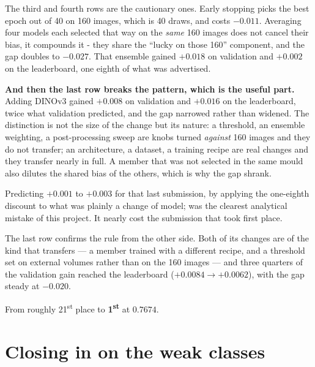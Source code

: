 \documentclass{article}
\begin{document}
The third and fourth rows are the cautionary ones. Early stopping picks the best
epoch out of 40 on 160 images, which is 40 draws, and costs $-0.011$. Averaging
four models each selected that way on the \emph{same} 160 images does not cancel
their bias, it compounds it - they share the ``lucky on those 160'' component,
and the gap doubles to $-0.027$. That ensemble gained $+0.018$ on validation and
$+0.002$ on the leaderboard, one eighth of what was advertised.

\vspace{2.0mm}

\noindent \textbf{And then the last row breaks the pattern, which is the useful
part.} Adding DINOv3 gained $+0.008$ on validation and $+0.016$ on the
leaderboard, twice what validation predicted, and the gap narrowed rather than
widened. The distinction is not the size of the change but its nature: a
threshold, an ensemble weighting, a post-processing sweep are knobs turned
\emph{against} 160 images and they do not transfer; an architecture, a dataset, a
training recipe are real changes and they transfer nearly in full. A member that
was not selected in the same mould also dilutes the shared bias of the others,
which is why the gap shrank.

\vspace{2.0mm}

\noindent Predicting $+0.001$ to $+0.003$ for that last submission, by
applying the one-eighth discount to what was plainly a change of model; was
the clearest analytical mistake of this project. It nearly cost the submission
that took first place.

\vspace{2.0mm}

\noindent The last row confirms the rule from the other side. Both of its changes
are of the kind that transfers --- a member trained with a different recipe, and
a threshold set on external volumes rather than on the 160 images --- and three
quarters of the validation gain reached the leaderboard ($+0.0084 \to +0.0062$),
with the gap steady at $-0.020$.

\vspace{2.0mm}

\noindent From roughly 21\textsuperscript{st} place to
\textbf{1\textsuperscript{st}} at $0.7674$.

\newpage

\section{Closing in on the weak classes}
\label{sec:weak}
\end{document}
